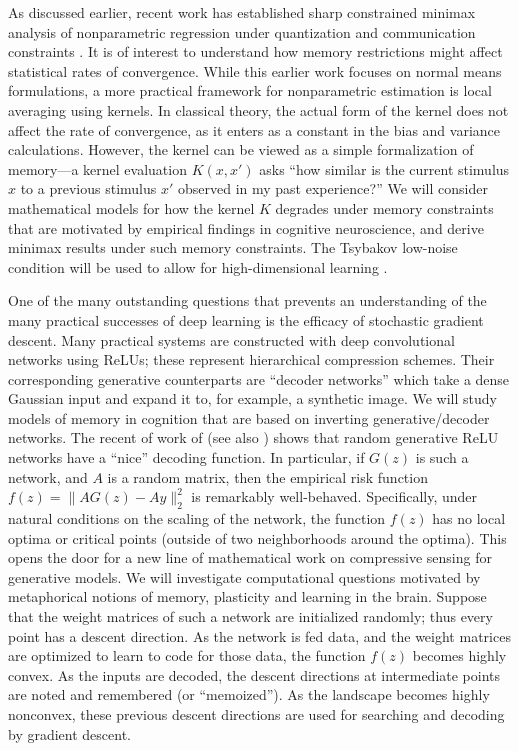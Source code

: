 As discussed earlier, recent work has established 
sharp constrained minimax analysis of nonparametric
regression under quantization and communication constraints \citep{Zhu:18,Zhu:18b}.
It is of interest to understand how memory restrictions might affect
statistical rates of convergence. While this earlier work focuses on
normal means formulations, a more practical framework for
nonparametric estimation is local averaging using kernels. In
classical theory, the actual form of the kernel does not affect the
rate of convergence, as it enters as a constant in the bias and
variance calculations. However, the kernel can be viewed as a
simple formalization of memory---a kernel evaluation $K(x,x')$ asks
``how similar is the current stimulus $x$ to a previous stimulus $x'$
observed in my past experience?'' We will consider mathematical models for
how the kernel $K$ degrades under memory constraints that
are motivated by empirical findings in cognitive neuroscience,
and derive minimax results under such memory constraints. The
Tsybakov low-noise condition will be used to allow for
high-dimensional learning \citep{mammen1999,tsybakov2004}.



One of the many outstanding questions that prevents an understanding
of the many practical successes of deep learning is the efficacy
of stochastic gradient descent. Many practical systems
are constructed with deep convolutional networks using ReLUs;
these represent hierarchical compression schemes. Their corresponding
generative counterparts are ``decoder networks'' which take
a dense Gaussian input and expand it to, for example, a synthetic image.
We will study models of memory in cognition that are based on
inverting generative/decoder networks. The recent
of work of \cite{HandV17} (see also \cite{HandV18}) shows
that random generative ReLU networks have a ``nice'' decoding
function. In particular, if $G(z)$ is such a network, and $A$ is
a random matrix, then the empirical risk function 
$ f(z) = \|AG(z) - Ay\|_2^2$ is remarkably well-behaved. Specifically,
under natural conditions on the scaling of the network,
the function $f(z)$ has no local optima or critical points (outside of
two neighborhoods around the optima). This opens the door for
a new line of mathematical work on compressive sensing for generative
models. We will investigate computational questions motivated
by metaphorical notions of memory, plasticity and learning in the brain. Suppose that
the weight matrices of such a network are initialized randomly; thus
every point has a descent direction. As the network is fed data,
and the weight matrices are optimized to learn to code for those data,
the function $f(z)$ becomes highly convex. As the inputs are decoded, 
the descent directions at intermediate points are noted and remembered
(or ``memoized''). As the landscape becomes highly nonconvex, these
previous descent directions are used for searching and decoding
by gradient descent. 

